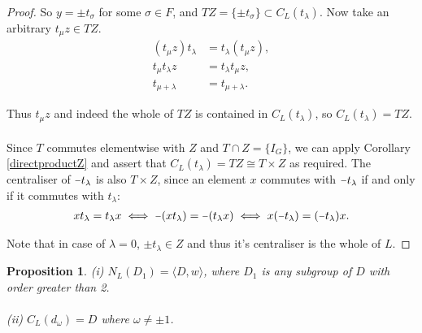 \documentclass[a4paper , 11pt]{book}
\newcommand{\minus}{\scalebox{0.75}[1.0]{$-$}}
\newtheorem{proposition}[theorem]{Proposition}
\theoremstyle{definition}
\theoremstyle{remark}
\begin{document}
\begin{proof}
So $y = \pm t_\sigma$ for some $\sigma \in F$, and $TZ = \{ \pm t_\sigma \} \subset C_L(t_\lambda)$. Now take an arbitrary $t_\mu z \in TZ$.
\begin{align*} (t_\mu z) t_\lambda &= t_\lambda (t_\mu z),
\\ t_\mu t_\lambda z &= t_\lambda t_\mu z, \tag{since $z \in Z$}
\\ t_{\mu + \lambda} &= t_{\mu + \lambda}.
\end{align*}

Thus $t_\mu z$ and indeed the whole of $TZ$ is contained in $ C_L(t_\lambda)$, so $C_L(t_\lambda) = TZ$. \\
\\
Since $T$ commutes elementwise with $Z$ and $T \cap Z = \{ I_G \}$, we can apply Corollary \ref{directproductZ} and assert that $C_L(t_\lambda) = TZ \cong T \times Z$ as required. The centraliser of $\minus t_\lambda$ is also $T \times Z$, since an element $x$ commutes with $\minus t_\lambda$ if and only if it commutes with $t_\lambda$:
\begin{align*} xt_\lambda = t_\lambda x \iff   \minus(x t_\lambda) = \minus (t_\lambda x) \iff x(\minus t_\lambda) = (\minus t_\lambda)x.
\end{align*}

Note that in case of $\lambda = 0$, $\pm t_\lambda \in Z$ and thus it's centraliser is the whole of $L$.

\end{proof}

\begin{proposition}\label{6.4ii}
(i) $N_L(D_1) = \langle D , w \rangle$, where  $D_1$ is any subgroup of $D$ with order greater than 2. \\
\\
(ii) $C_L(d_\omega)= D$ where $\omega \neq \pm 1$.
\end{proposition}
\end{document}
